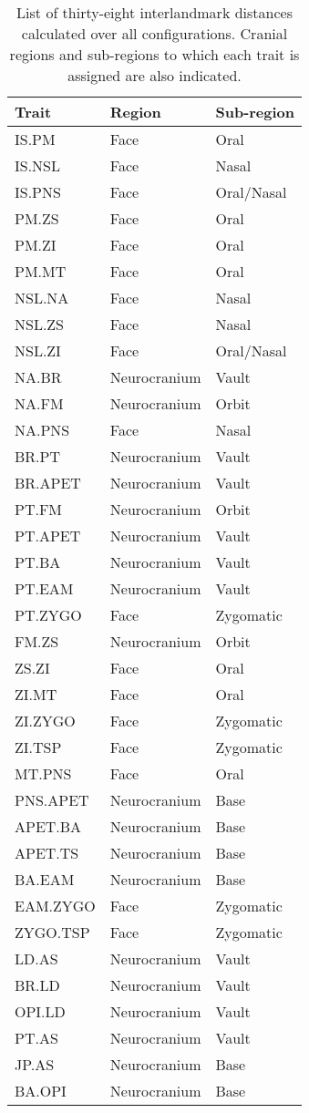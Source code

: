 \begin {table}[hp]
  \centering
  \caption {List of thirty-eight interlandmark distances calculated over all configurations. Cranial regions and sub-regions to which each trait is assigned are also indicated.}
  \label {tab:dist}
  \hr
  \begin {tabularx} {\textwidth} {X X X}
    {\bf Trait} & {\bf Region} & {\bf Sub-region}  \\
    \hline
    IS.PM & Face & Oral \\
    IS.NSL & Face & Nasal \\
    IS.PNS & Face & Oral/Nasal \\
    PM.ZS & Face & Oral \\
    PM.ZI & Face & Oral \\
    PM.MT & Face & Oral \\
    NSL.NA & Face & Nasal \\
    NSL.ZS & Face & Nasal \\
    NSL.ZI & Face & Oral/Nasal \\
    NA.BR & Neurocranium & Vault \\
    NA.FM & Neurocranium & Orbit \\
    NA.PNS & Face & Nasal \\
    BR.PT & Neurocranium & Vault \\
    BR.APET & Neurocranium & Vault \\
    PT.FM & Neurocranium & Orbit \\
    PT.APET & Neurocranium & Vault \\
    PT.BA & Neurocranium & Vault \\
    PT.EAM & Neurocranium & Vault \\
    PT.ZYGO & Face & Zygomatic \\
    FM.ZS & Neurocranium & Orbit \\
    ZS.ZI & Face & Oral \\
    ZI.MT & Face & Oral \\
    ZI.ZYGO & Face & Zygomatic \\
    ZI.TSP & Face & Zygomatic \\
    MT.PNS & Face & Oral \\
    PNS.APET & Neurocranium & Base \\
    APET.BA & Neurocranium & Base \\
    APET.TS & Neurocranium & Base \\
    BA.EAM & Neurocranium & Base \\
    EAM.ZYGO & Face & Zygomatic \\
    ZYGO.TSP & Face & Zygomatic \\
    LD.AS & Neurocranium & Vault \\
    BR.LD & Neurocranium & Vault \\
    OPI.LD & Neurocranium & Vault \\
    PT.AS & Neurocranium & Vault \\
    JP.AS & Neurocranium & Base \\
    BA.OPI & Neurocranium & Base \\
  \end {tabularx}
  \hr
\end {table} %
